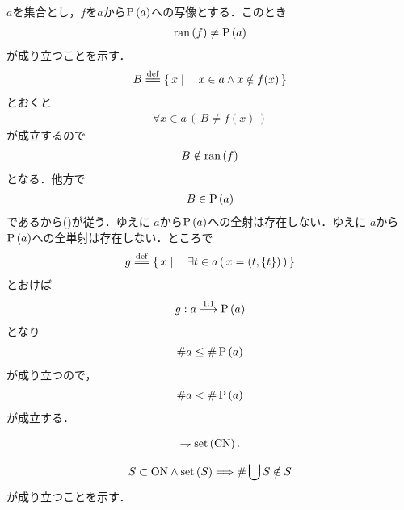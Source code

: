 	\begin{sketch}
		$a$を集合とし，$f$を$a$から$\operatorname*{P} \left(a\right)$への写像とする．このとき
		\begin{align}
			\operatorname*{ran} \left(f\right) \neq \operatorname*{P} \left(a\right)
			\label{eq:Cantor_cardinality_theorem}
		\end{align}
		が成り立つことを示す．
		\begin{align}
			B \defeq \Set{x}{x \in a \wedge x \notin f(x)}
		\end{align}
		とおくと
		\begin{align}
			\forall x \in a\, \left(\, B \neq f(x)\, \right)
		\end{align}
		が成立するので
		\begin{align}
			B \notin \operatorname*{ran} \left(f\right)
		\end{align}
		となる．他方で
		\begin{align}
			B \in \operatorname*{P} \left(a\right)
		\end{align}
		であるから()が従う．ゆえに
		$a$から$\operatorname*{P} \left(a\right)$への全射は存在しない．ゆえに
		$a$から$\operatorname*{P} \left(a\right)$への全単射は存在しない．ところで
		\begin{align}
			g \defeq \Set{x}{\exists t \in a\, (\, x = (t,\{t\})\, )}
		\end{align}
		とおけば
		\begin{align}
			g: a \overset{\mathrm{1:1}}{\longrightarrow} \operatorname*{P} \left(a\right) 
		\end{align}
		となり
		\begin{align}
			\# a \leq \# \operatorname*{P} \left(a\right)
		\end{align}
		が成り立つので，
		\begin{align}
			\# a < \# \operatorname*{P} \left(a\right)
		\end{align}
		が成立する．
		\QED
	\end{sketch}
	
	\begin{screen}
		\begin{thm}[$\CN$は集合でない]
			\begin{align}
				\rightharpoondown \operatorname*{set} \left(\mathrm{CN}\right).
			\end{align}
		\end{thm}
	\end{screen}
	
	\begin{sketch}
		\begin{align}
			S \subset \mathrm{ON} \wedge \operatorname*{set} \left(S\right) \Longrightarrow \# \bigcup S \notin S
		\end{align}
		が成り立つことを示す．
	\end{sketch}
	
